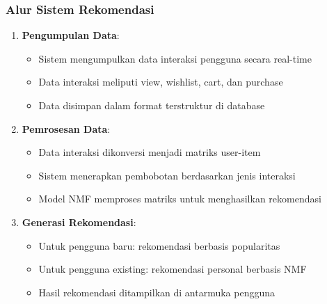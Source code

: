 \documentclass[journal,article,submit,pdftex,moreauthors]{Definitions/mdpi}
\begin{document}
\subsubsection{Alur Sistem Rekomendasi}
\begin{enumerate}
    \item \textbf{Pengumpulan Data}:
    \begin{itemize}
        \item Sistem mengumpulkan data interaksi pengguna secara real-time
        \item Data interaksi meliputi view, wishlist, cart, dan purchase
        \item Data disimpan dalam format terstruktur di database
    \end{itemize}

    \item \textbf{Pemrosesan Data}:
    \begin{itemize}
        \item Data interaksi dikonversi menjadi matriks user-item
        \item Sistem menerapkan pembobotan berdasarkan jenis interaksi
        \item Model NMF memproses matriks untuk menghasilkan rekomendasi
    \end{itemize}

    \item \textbf{Generasi Rekomendasi}:
    \begin{itemize}
        \item Untuk pengguna baru: rekomendasi berbasis popularitas
        \item Untuk pengguna existing: rekomendasi personal berbasis NMF
        \item Hasil rekomendasi ditampilkan di antarmuka pengguna
    \end{itemize}
\end{enumerate}
\end{document}
